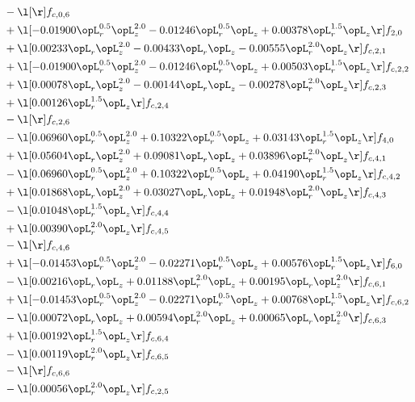 \begin{alignat}{2}
& - \l[  \r] f_{c,0,6} \nonumber \\ 
& + \l[  -0.01900 \opL_r^{0.5} \opL_z^{2.0}   -0.01246 \opL_r^{0.5} \opL_z +  0.00378 \opL_r^{1.5} \opL_z  \r] f_{2,0} \nonumber \\ 
& + \l[  0.00233 \opL_r \opL_z^{2.0}   -0.00433 \opL_r \opL_z   -0.00555 \opL_r^{2.0} \opL_z  \r] f_{c,2,1} \nonumber \\ 
& + \l[  -0.01900 \opL_r^{0.5} \opL_z^{2.0}   -0.01246 \opL_r^{0.5} \opL_z +  0.00503 \opL_r^{1.5} \opL_z  \r] f_{c,2,2} \nonumber \\ 
& + \l[  0.00078 \opL_r \opL_z^{2.0}   -0.00144 \opL_r \opL_z   -0.00278 \opL_r^{2.0} \opL_z  \r] f_{c,2,3} \nonumber \\ 
& + \l[  0.00126 \opL_r^{1.5} \opL_z  \r] f_{c,2,4} \nonumber \\ 
& - \l[  \r] f_{c,2,6} \nonumber \\ 
& - \l[  0.06960 \opL_r^{0.5} \opL_z^{2.0} +  0.10322 \opL_r^{0.5} \opL_z +  0.03143 \opL_r^{1.5} \opL_z  \r] f_{4,0} \nonumber \\ 
& + \l[  0.05604 \opL_r \opL_z^{2.0} +  0.09081 \opL_r \opL_z +  0.03896 \opL_r^{2.0} \opL_z  \r] f_{c,4,1} \nonumber \\ 
& - \l[  0.06960 \opL_r^{0.5} \opL_z^{2.0} +  0.10322 \opL_r^{0.5} \opL_z +  0.04190 \opL_r^{1.5} \opL_z  \r] f_{c,4,2} \nonumber \\ 
& + \l[  0.01868 \opL_r \opL_z^{2.0} +  0.03027 \opL_r \opL_z +  0.01948 \opL_r^{2.0} \opL_z  \r] f_{c,4,3} \nonumber \\ 
& - \l[  0.01048 \opL_r^{1.5} \opL_z  \r] f_{c,4,4} \nonumber \\ 
& + \l[  0.00390 \opL_r^{2.0} \opL_z  \r] f_{c,4,5} \nonumber \\ 
& - \l[  \r] f_{c,4,6} \nonumber \\ 
& + \l[  -0.01453 \opL_r^{0.5} \opL_z^{2.0}   -0.02271 \opL_r^{0.5} \opL_z +  0.00576 \opL_r^{1.5} \opL_z  \r] f_{6,0} \nonumber \\ 
& - \l[  0.00216 \opL_r \opL_z +  0.01188 \opL_r^{2.0} \opL_z +  0.00195 \opL_r \opL_z^{2.0}  \r] f_{c,6,1} \nonumber \\ 
& + \l[  -0.01453 \opL_r^{0.5} \opL_z^{2.0}   -0.02271 \opL_r^{0.5} \opL_z +  0.00768 \opL_r^{1.5} \opL_z  \r] f_{c,6,2} \nonumber \\ 
& - \l[  0.00072 \opL_r \opL_z +  0.00594 \opL_r^{2.0} \opL_z +  0.00065 \opL_r \opL_z^{2.0}  \r] f_{c,6,3} \nonumber \\ 
& + \l[  0.00192 \opL_r^{1.5} \opL_z  \r] f_{c,6,4} \nonumber \\ 
& - \l[  0.00119 \opL_r^{2.0} \opL_z  \r] f_{c,6,5} \nonumber \\ 
& - \l[  \r] f_{c,6,6} \nonumber \\ 
& - \l[  0.00056 \opL_r^{2.0} \opL_z  \r] f_{c,2,5} \nonumber \\ 
\end{alignat} 


